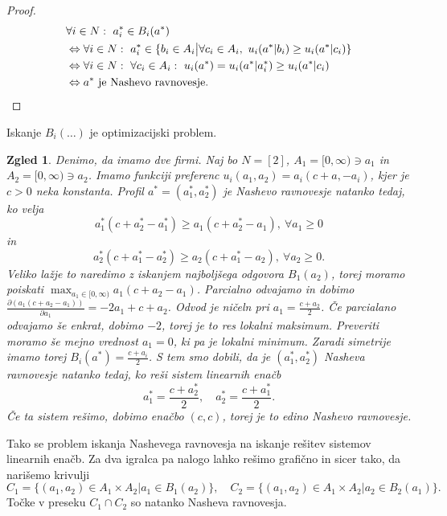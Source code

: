 \documentclass[10pt, a4paper]{article}
\newtheorem{zgled}[izr]{Zgled}
\newenvironment{noticeC}{%
  \tcolorbox[%
  notitle,
  empty,
  enhanced,  %
  breakable,
  coltext=black, 
  fontupper=\rmfamily,
  parbox=false,
  noparskip,
  sharp corners,
  boxrule=-1pt,  %
  frame hidden,
  left=7pt,  %
  right=7pt,
  top=5pt,
  bottom=5pt,
  before skip=2.5ex plus 2pt,
  after skip=2.5ex plus 2pt,
  overlay unbroken and last={%
  },
  ]}
{\endtcolorbox}
\newenvironment{dokaz}%
  {\begin{noticeC}\begin{proof}}%
  {\end{proof}\end{noticeC}}
\begin{document}
\begin{dokaz}
  \begin{align*}
    &\forall i \in N:\ a_i^* \in B_i (a^*)\\
    &\Leftrightarrow \forall i \in N:\ a_i^* \in \{b_i \in A_i \big| \forall c_i \in A_i,\ u_i(a^* | b_i) \geq u_i (a^* | c_i)\}\\
    &\Leftrightarrow \forall i \in N:\ \forall c_i \in A_i:\ u_i(a^*) = u_i (a^* | a_i^*) \geq u_i(a^* | c_i)\\
    &\Leftrightarrow \text{$a^*$ je Nashevo ravnovesje.} \qedhere
  \end{align*}
\end{dokaz}

Iskanje $B_i (\dots)$ je optimizacijski problem.

\begin{zgled}
  Denimo, da imamo dve firmi.
  Naj bo $N = [2]$, $A_1 = [0, \infty) \ni a_1$ in $A_2 = [0, \infty) \ni a_2$.
  Imamo funkciji preferenc $u_i (a_1, a_2) = a_i (c + a, -a_i)$, kjer je $c > 0$ neka konstanta.
  Profil $a^* = (a_1^*, a_2^*)$ je Nashevo ravnovesje natanko tedaj, ko velja 
  $$a_1^* (c + a_2^* - a_1^*) \geq a_1 (c + a_2^* - a_1),\ \forall a_1 \geq 0$$
  in 
  $$a_2^* (c + a_1^* - a_2^*) \geq a_2 (c + a_1^* - a_2),\ \forall a_2 \geq 0.$$
  Veliko lažje to naredimo z iskanjem najboljšega odgovora $B_1 (a_2)$, torej moramo poiskati $\max_{a_1 \in [0, \infty)} a_1 (c + a_2 - a_1)$.
  Parcialno odvajamo in dobimo $\frac{\partial (a_1 (c + a_2 - a_1))}{\partial a_1} = - 2 a_1 + c + a_2$.
  Odvod je ničeln pri $a_1 = \frac{c + a_2}{2}$. Če parcialano odvajamo še enkrat, dobimo $-2$, torej je to res lokalni maksimum.
  Preveriti moramo še mejno vrednost $a_1 = 0$, ki pa je lokalni minimum.
  Zaradi simetrije imamo torej $B_i (a^*) = \frac{c + a_i}{2}$.
  S tem smo dobili, da je $(a_1^*, a_2^*)$ Nasheva ravnovesje natanko tedaj, ko reši sistem linearnih enačb 
  $$a_1^* = \frac{c + a_2^*}{2}, \quad a_2^* = \frac{c + a_1^*}{2}.$$
  Če ta sistem rešimo, dobimo enačbo $(c, c)$, torej je to edino Nashevo ravnovesje.
\end{zgled}

Tako se problem iskanja Nashevega ravnovesja na iskanje rešitev sistemov linearnih enačb.
Za dva igralca pa nalogo lahko rešimo grafično in sicer tako, da narišemo krivulji 
$$C_1 = \{(a_1, a_2) \in A_1 \times A_2 \big| a_1 \in B_1 (a_2)\},\quad C_2 = \{(a_1, a_2) \in A_1 \times A_2 \big| a_2 \in B_2 (a_1)\}.$$
Točke v preseku $C_1 \cap C_2$ so natanko Nasheva ravnovesja.
\end{document}
